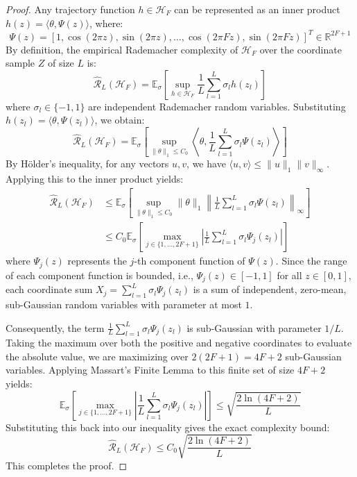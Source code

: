 \begin{proof}
Any trajectory function $h \in \mathcal{H}_F$ can be represented as an inner product $h(z) = \langle \theta, \Psi(z) \rangle$, where:
\begin{equation}
    \Psi(z) = [1, \cos(2\pi z), \sin(2\pi z), \dots, \cos(2\pi F z), \sin(2\pi F z)]^T \in \mathbb{R}^{2F+1}
\end{equation}
By definition, the empirical Rademacher complexity of $\mathcal{H}_F$ over the coordinate sample $Z$ of size $L$ is:
\begin{equation}
    \widehat{\mathcal{R}}_L(\mathcal{H}_F) = \mathbb{E}_{\sigma} \left[ \sup_{h \in \mathcal{H}_F} \frac{1}{L} \sum_{l=1}^L \sigma_l h(z_l) \right]
\end{equation}
where $\sigma_l \in \{-1, 1\}$ are independent Rademacher random variables. Substituting $h(z_l) = \langle \theta, \Psi(z_l) \rangle$, we obtain:
\begin{equation}
    \widehat{\mathcal{R}}_L(\mathcal{H}_F) = \mathbb{E}_{\sigma} \left[ \sup_{\|\theta\|_1 \le C_0} \left\langle \theta, \frac{1}{L} \sum_{l=1}^L \sigma_l \Psi(z_l) \right\rangle \right]
\end{equation}
By H{\"o}lder's inequality, for any vectors $u, v$, we have $\langle u, v \rangle \le \|u\|_1 \|v\|_\infty$. Applying this to the inner product yields:
\begin{align}
    \widehat{\mathcal{R}}_L(\mathcal{H}_F) &\le \mathbb{E}_{\sigma} \left[ \sup_{\|\theta\|_1 \le C_0} \|\theta\|_1 \left\| \frac{1}{L} \sum_{l=1}^L \sigma_l \Psi(z_l) \right\|_\infty \right] \\
    &\le C_0 \mathbb{E}_{\sigma} \left[ \max_{j \in \{1, \dots, 2F+1\}} \left| \frac{1}{L} \sum_{l=1}^L \sigma_l \Psi_j(z_l) \right| \right]
\end{align}
where $\Psi_j(z)$ represents the $j$-th component function of $\Psi(z)$. Since the range of each component function is bounded, i.e., $\Psi_j(z) \in [-1, 1]$ for all $z \in [0, 1]$, each coordinate sum $X_j = \sum_{l=1}^L \sigma_l \Psi_j(z_l)$ is a sum of independent, zero-mean, sub-Gaussian random variables with parameter at most $1$.

Consequently, the term $\frac{1}{L} \sum_{l=1}^L \sigma_l \Psi_j(z_l)$ is sub-Gaussian with parameter $1/L$. Taking the maximum over both the positive and negative coordinates to evaluate the absolute value, we are maximizing over $2(2F+1) = 4F+2$ sub-Gaussian variables. Applying Massart's Finite Lemma to this finite set of size $4F+2$ yields:
\begin{equation}
    \mathbb{E}_{\sigma} \left[ \max_{j \in \{1, \dots, 2F+1\}} \left| \frac{1}{L} \sum_{l=1}^L \sigma_l \Psi_j(z_l) \right| \right] \le \sqrt{\frac{2 \ln(4F+2)}{L}}
\end{equation}
Substituting this back into our inequality gives the exact complexity bound:
\begin{equation}
    \widehat{\mathcal{R}}_L(\mathcal{H}_F) \le C_0 \sqrt{\frac{2 \ln(4F+2)}{L}}
\end{equation}
This completes the proof.
\end{proof}


